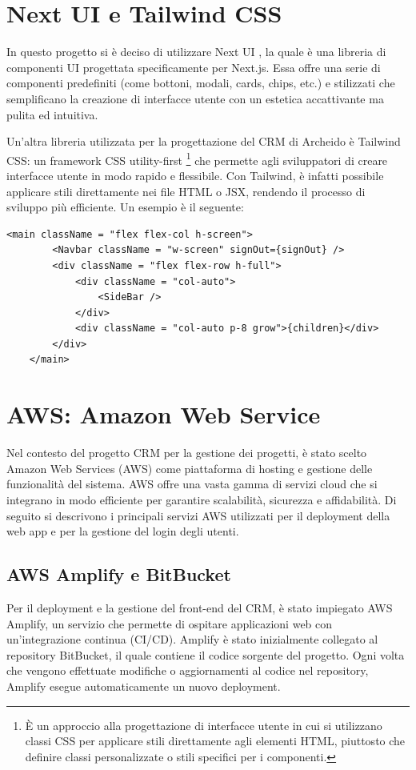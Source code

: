 \documentclass[target=bach,aauheader=,style=]{thud}
\begin{document}
\section{Next UI e Tailwind CSS}
In questo progetto si è deciso di utilizzare Next UI \cite{nextui2024}, la quale è una libreria di componenti UI progettata specificamente per Next.js. Essa offre una serie di componenti predefiniti (come bottoni, modali, cards, chips, etc.) e stilizzati che semplificano la creazione di interfacce utente con un estetica accattivante ma pulita ed intuitiva. 

\noindent Un'altra libreria utilizzata per la progettazione del CRM di Archeido è Tailwind CSS: un framework CSS utility-first \footnote{È un approccio alla progettazione di interfacce utente in cui si utilizzano classi CSS per applicare stili direttamente agli elementi HTML, piuttosto che definire classi personalizzate o stili specifici per i componenti.} che permette agli sviluppatori di creare interfacce utente in modo rapido e flessibile. Con Tailwind, è infatti possibile applicare stili direttamente nei file HTML o JSX, rendendo il processo di sviluppo più efficiente. Un esempio è il seguente:

\begin{lstlisting}[caption=Parte del file \texttt{app.tsx} del CRM]
    <main className = "flex flex-col h-screen">
        <Navbar className = "w-screen" signOut={signOut} />
        <div className = "flex flex-row h-full">
            <div className = "col-auto">
                <SideBar />
            </div>
            <div className = "col-auto p-8 grow">{children}</div>
        </div>
    </main> 
\end{lstlisting}


\section{AWS: Amazon Web Service}
Nel contesto del progetto CRM per la gestione dei progetti, è stato scelto Amazon Web Services (AWS) come piattaforma di hosting e gestione delle funzionalità del sistema. AWS offre una vasta gamma di servizi cloud che si integrano in modo efficiente per garantire scalabilità, sicurezza e affidabilità. Di seguito si descrivono i principali servizi AWS utilizzati per il deployment della web app e per la gestione del login degli utenti.

\subsection{AWS Amplify e BitBucket}
Per il deployment e la gestione del front-end del CRM, è stato impiegato AWS Amplify, un servizio che permette di ospitare applicazioni web con un'integrazione continua (CI/CD). Amplify è stato inizialmente collegato al repository BitBucket, il quale contiene il codice sorgente del progetto. Ogni volta che vengono effettuate modifiche o aggiornamenti al codice nel repository, Amplify esegue automaticamente un nuovo deployment.
\end{document}
